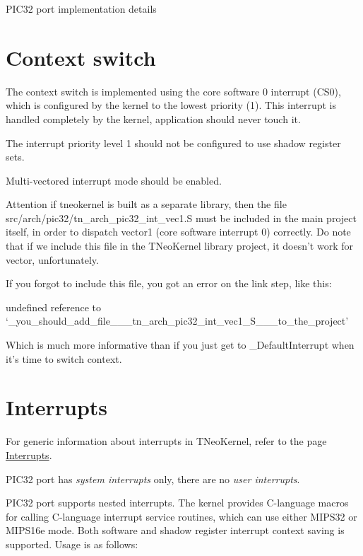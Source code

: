 P\+I\+C32 port implementation details\hypertarget{pic32_details_pic32_context_switch}{}\section{Context switch}\label{pic32_details_pic32_context_switch}
The context switch is implemented using the core software 0 interrupt ({\ttfamily C\+S0}), which is configured by the kernel to the lowest priority (1). This interrupt is handled completely by the kernel, application should never touch it.

The interrupt priority level 1 should not be configured to use shadow register sets.

Multi-\/vectored interrupt mode should be enabled.

\begin{DoxyAttention}{Attention}
if tneokernel is built as a separate library, then the file {\ttfamily src/arch/pic32/tn\+\_\+arch\+\_\+pic32\+\_\+int\+\_\+vec1.\+S} must be included in the main project itself, in order to dispatch vector1 (core software interrupt 0) correctly. Do note that if we include this file in the T\+Neo\+Kernel library project, it doesn't work for vector, unfortunately.

If you forgot to include this file, you got an error on the link step, like this\+: 
\begin{DoxyCode}
undefined reference to `\_you\_should\_add\_file\_\_\_tn\_arch\_pic32\_int\_vec1\_S\_\_\_to\_the\_project\textcolor{stringliteral}{'}
\end{DoxyCode}
 Which is much more informative than if you just get to {\ttfamily \+\_\+\+Default\+Interrupt} when it's time to switch context.
\end{DoxyAttention}
\hypertarget{pic32_details_pic32_interrupts}{}\section{Interrupts}\label{pic32_details_pic32_interrupts}
For generic information about interrupts in T\+Neo\+Kernel, refer to the page \hyperlink{interrupts}{Interrupts}.

P\+I\+C32 port has {\itshape system interrupts} only, there are no {\itshape user interrupts}.

P\+I\+C32 port supports nested interrupts. The kernel provides C-\/language macros for calling C-\/language interrupt service routines, which can use either M\+I\+P\+S32 or M\+I\+P\+S16e mode. Both software and shadow register interrupt context saving is supported. Usage is as follows\+:


